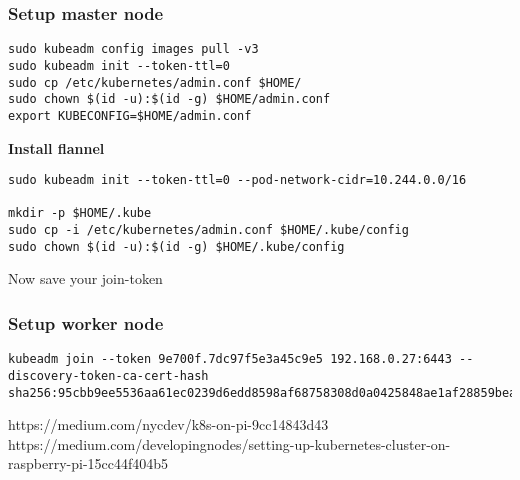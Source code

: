 \subsubsection{Setup master node}
\begin{verbatim}
sudo kubeadm config images pull -v3
sudo kubeadm init --token-ttl=0
sudo cp /etc/kubernetes/admin.conf $HOME/ 
sudo chown $(id -u):$(id -g) $HOME/admin.conf 
export KUBECONFIG=$HOME/admin.conf 
\end{verbatim}

%

\textbf{Install flannel}
\begin{verbatim}
sudo kubeadm init --token-ttl=0 --pod-network-cidr=10.244.0.0/16

mkdir -p $HOME/.kube
sudo cp -i /etc/kubernetes/admin.conf $HOME/.kube/config
sudo chown $(id -u):$(id -g) $HOME/.kube/config
\end{verbatim}

Now save your join-token

\subsubsection{Setup worker node}
\begin{verbatim}
kubeadm join --token 9e700f.7dc97f5e3a45c9e5 192.168.0.27:6443 --discovery-token-ca-cert-hash sha256:95cbb9ee5536aa61ec0239d6edd8598af68758308d0a0425848ae1af28859bea
\end{verbatim}






https://medium.com/nycdev/k8s-on-pi-9cc14843d43
https://medium.com/developingnodes/setting-up-kubernetes-cluster-on-raspberry-pi-15cc44f404b5

